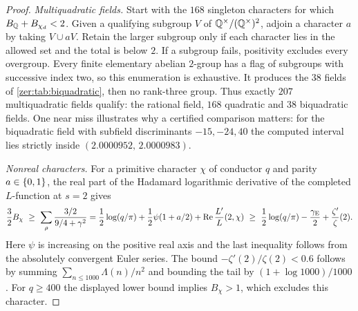 \begin{proof}
\emph{Multiquadratic fields.} Start with the $168$ singleton characters for which
$B_{\mathbb{Q}}+B_{\chi_d}<2$. Given a qualifying subgroup $V$ of $\mathbb{Q}^\times/(\mathbb{Q}^\times)^2$, adjoin
a character $a$ by taking $V\cup aV$. Retain the larger subgroup only if each character
lies in the allowed set and the total is below $2$. If a subgroup fails, positivity
excludes every overgroup. Every finite elementary abelian $2$-group has a flag of
subgroups with successive index two, so this enumeration is exhaustive. It produces the
$38$ fields of \cref{zer:tab:biquadratic}, then no rank-three group. Thus exactly $207$
multiquadratic fields qualify: the rational field, $168$ quadratic and $38$ biquadratic
fields. One near miss illustrates why a certified comparison matters: for the biquadratic
field with subfield discriminants $-15,-24,40$ the computed interval lies strictly inside
$(2.0000952,\,2.0000983)$.

\emph{Nonreal characters.} For a primitive character $\chi$ of conductor $q$ and parity
$a\in\{0,1\}$, the real part of the Hadamard logarithmic derivative of the completed
$L$-function at $s=2$ gives
\[
 \frac32B_\chi\ \ge\ \sum_\rho\frac{3/2}{9/4+\gamma^2}
 =\frac12\log(q/\pi)+\frac12\psi(1+a/2)+\Re\frac{L'}L(2,\chi)
 \ \ge\ \frac12\log(q/\pi)-\frac{\zergE}2+\frac{\zeta'}\zeta(2).
\]
Here $\psi$ is increasing on the positive real axis and the last inequality follows from
the absolutely convergent Euler series. The bound $-\zeta'(2)/\zeta(2)<0.6$ follows by
summing $\sum_{n\le1000}\Lambda(n)/n^2$ and bounding the tail by $(1+\log1000)/1000$. For
$q\ge400$ the displayed lower bound implies $B_\chi>1$, which excludes this character.


\end{proof}
